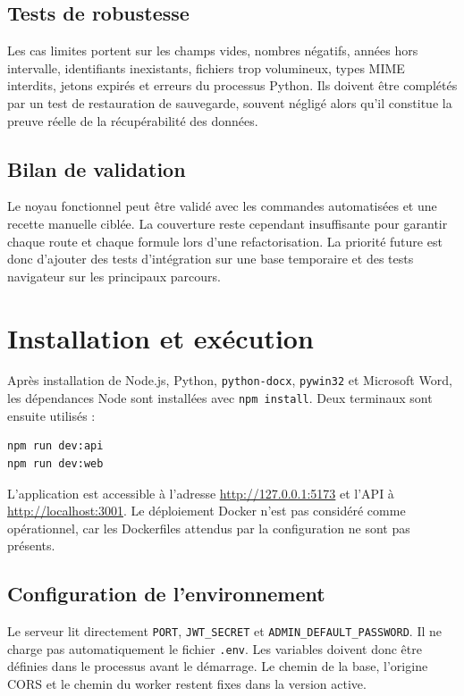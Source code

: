 \documentclass[12pt,a4paper,oneside]{report}
\newcommand{\code}[1]{\texttt{#1}}
\begin{document}
\subsection{Tests de robustesse}
Les cas limites portent sur les champs vides, nombres négatifs, années hors intervalle, identifiants inexistants, fichiers trop volumineux, types MIME interdits, jetons expirés et erreurs du processus Python. Ils doivent être complétés par un test de restauration de sauvegarde, souvent négligé alors qu'il constitue la preuve réelle de la récupérabilité des données.

\subsection{Bilan de validation}
Le noyau fonctionnel peut être validé avec les commandes automatisées et une recette manuelle ciblée. La couverture reste cependant insuffisante pour garantir chaque route et chaque formule lors d'une refactorisation. La priorité future est donc d'ajouter des tests d'intégration sur une base temporaire et des tests navigateur sur les principaux parcours.

\section{Installation et exécution}
Après installation de Node.js, Python, \code{python-docx}, \code{pywin32} et Microsoft Word, les dépendances Node sont installées avec \code{npm install}. Deux terminaux sont ensuite utilisés :
\begin{lstlisting}[language=bash,caption={Démarrage local}]
npm run dev:api
npm run dev:web
\end{lstlisting}
L'application est accessible à l'adresse \url{http://127.0.0.1:5173} et l'API à \url{http://localhost:3001}. Le déploiement Docker n'est pas considéré comme opérationnel, car les Dockerfiles attendus par la configuration ne sont pas présents.

\subsection{Configuration de l'environnement}
Le serveur lit directement \code{PORT}, \code{JWT\_SECRET} et \code{ADMIN\_DEFAULT\_PASSWORD}. Il ne charge pas automatiquement le fichier \code{.env}. Les variables doivent donc être définies dans le processus avant le démarrage. Le chemin de la base, l'origine CORS et le chemin du worker restent fixes dans la version active.
\end{document}

